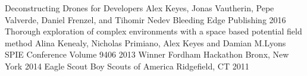 \begin{cvhonors}
    \cvhonor
    {Deconstructing Drones for Developers}
    {Alex Keyes, Jonas Vautherin, Pepe Valverde, Daniel Frenzel, and Tihomir Nedev}
    {Bleeding Edge Publishing}
    {2016}
  \cvhonor
    {Thorough exploration of complex environments with a space based potential field method}
    {Alina Kenealy, Nicholas Primiano, Alex Keyes and Damian M.Lyons}
    {SPIE Conference Volume 9406}
    {2013}
  \cvhonor
    {Winner}
    {Fordham Hackathon}
    {Bronx, New York}
    {2014}
   \cvhonor
    {Eagle Scout}
    {Boy Scouts of America}
    {Ridgefield, CT}
    {2011}
\end{cvhonors}
